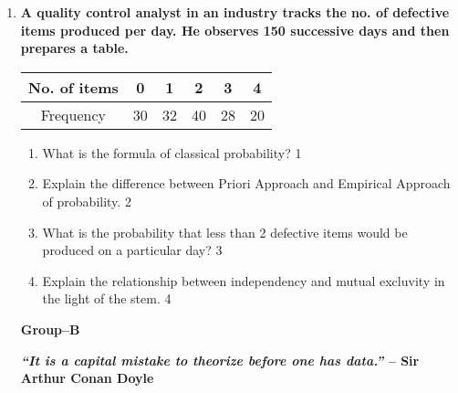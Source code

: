 \documentclass{article}
\begin{document}
  \begin{enumerate}
  
 \item
	  \textbf{A quality control analyst in an industry tracks the no. of defective items produced per day. He observes 150 successive days and then prepares a table.} 
	  
	  \begin{table}[h]
	  \centering
\begin{tabular}{c|c|c|c|c|c} \hline
No. of items & 0 & 1 & 2 & 3 & 4 \\ \hline
Frequency & 30 & 32 & 40 & 28 & 20 \\ \hline
\end{tabular}
\end{table}
  
  \begin{enumerate}
    \item
	What is the formula of classical probability? \hfill 1
    \item
	Explain the difference between Priori Approach and Empirical Approach of probability. \hfill 2
    \item  
	What is the probability that less than 2 defective items would be produced on a particular day? \hfill 3
    \item
	Explain the relationship between independency and mutual excluvity in the light of the stem. \hfill 4
  \end{enumerate}
  
    \begin{center}
  \textbf{Group--B}
  \end{center}
  


\begin{center}
\textbf{\textit{“It is a capital mistake to theorize before one has data.”} – Sir Arthur Conan Doyle}
\end{center}
  
\end{enumerate}
\end{document}
